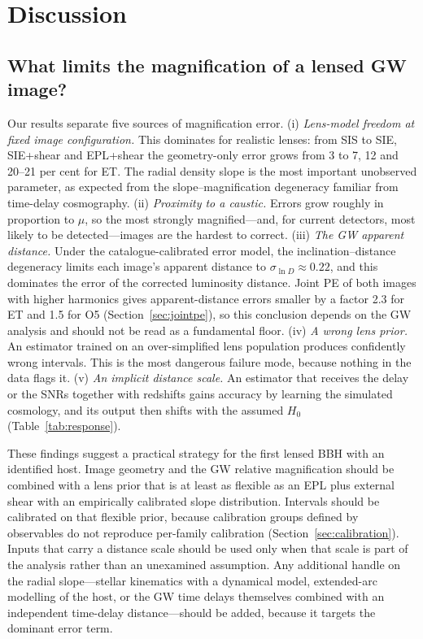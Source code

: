 \section{Discussion}
\label{sec:discussion}
\subsection{What limits the magnification of a lensed GW image?}
Our results separate five sources of magnification error. (i) \emph{Lens-model freedom at fixed image configuration.} This dominates for realistic lenses: from SIS to SIE, SIE+shear and EPL+shear the geometry-only error grows from 3 to 7, 12 and 20--21 per cent for ET. The radial density slope is the most important unobserved parameter, as expected from the slope--magnification degeneracy familiar from time-delay cosmography. (ii) \emph{Proximity to a caustic.} Errors grow roughly in proportion to $\mu$, so the most strongly magnified---and, for current detectors, most likely to be detected---images are the hardest to correct. (iii) \emph{The GW apparent distance.} Under the catalogue-calibrated error model, the inclination--distance degeneracy limits each image's apparent distance to $\sigma_{\ln D}\approx0.22$, and this dominates the error of the corrected luminosity distance. Joint PE of both images with higher harmonics gives apparent-distance errors smaller by a factor 2.3 for ET and 1.5 for O5 (Section~\ref{sec:jointpe}), so this conclusion depends on the GW analysis and should not be read as a fundamental floor. (iv) \emph{A wrong lens prior.} An estimator trained on an over-simplified lens population produces confidently wrong intervals. This is the most dangerous failure mode, because nothing in the data flags it. (v) \emph{An implicit distance scale.} An estimator that receives the delay or the SNRs together with redshifts gains accuracy by learning the simulated cosmology, and its output then shifts with the assumed $H_0$ (Table~\ref{tab:response}).

These findings suggest a practical strategy for the first lensed BBH with an identified host. Image geometry and the GW relative magnification should be combined with a lens prior that is at least as flexible as an EPL plus external shear with an empirically calibrated slope distribution. Intervals should be calibrated on that flexible prior, because calibration groups defined by observables do not reproduce per-family calibration (Section~\ref{sec:calibration}). Inputs that carry a distance scale should be used only when that scale is part of the analysis rather than an unexamined assumption. Any additional handle on the radial slope---stellar kinematics with a dynamical model, extended-arc modelling of the host, or the GW time delays themselves combined with an independent time-delay distance---should be added, because it targets the dominant error term.

